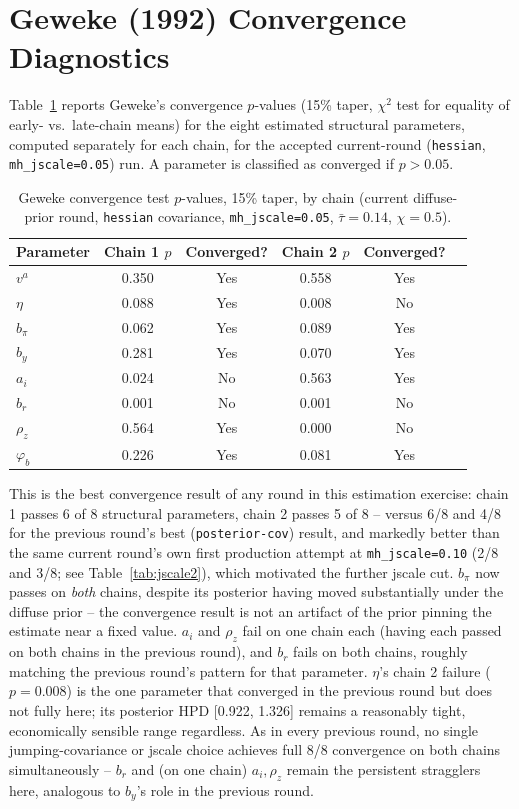 \documentclass[11pt]{article}
\begin{document}
\section{Geweke (1992) Convergence Diagnostics}
\label{sec:geweke}

Table~\ref{tab:geweke} reports Geweke's convergence $p$-values (15\%
taper, $\chi^2$ test for equality of early- vs.\ late-chain means) for
the eight estimated structural parameters, computed separately for each
chain, for the accepted current-round (\texttt{hessian},
\texttt{mh\_jscale=0.05}) run. A parameter is classified as converged if
$p>0.05$.

\begin{table}[h]
\centering
\small
\begin{tabular}{lccccc}
\toprule
Parameter & Chain 1 $p$ & Converged? & Chain 2 $p$ & Converged? \\
\midrule
$v^a$        & 0.350 & Yes & 0.558 & Yes \\
$\eta$       & 0.088 & Yes & 0.008 & No  \\
$b_\pi$      & 0.062 & Yes & 0.089 & Yes \\
$b_y$        & 0.281 & Yes & 0.070 & Yes \\
$a_i$        & 0.024 & No  & 0.563 & Yes \\
$b_r$        & 0.001 & No  & 0.001 & No  \\
$\rho_z$     & 0.564 & Yes & 0.000 & No  \\
$\varphi_b$  & 0.226 & Yes & 0.081 & Yes \\
\bottomrule
\end{tabular}
\caption{Geweke convergence test $p$-values, 15\% taper, by chain
(current diffuse-prior round, \texttt{hessian} covariance,
\texttt{mh\_jscale=0.05}, $\bar\tau=0.14$, $\chi=0.5$).}
\label{tab:geweke}
\end{table}

This is the best convergence result of any round in this estimation
exercise: chain 1 passes 6 of 8 structural parameters, chain 2 passes 5
of 8 -- versus 6/8 and 4/8 for the previous round's best
(\texttt{posterior-cov}) result, and markedly better than the same
current round's own first production attempt at \texttt{mh\_jscale=0.10}
(2/8 and 3/8; see Table~\ref{tab:jscale2}), which motivated the further
jscale cut. $b_\pi$ now passes on \emph{both} chains, despite its
posterior having moved substantially under the diffuse prior -- the
convergence result is not an artifact of the prior pinning the estimate
near a fixed value. $a_i$ and $\rho_z$ fail on one chain each (having
each passed on both chains in the previous round), and $b_r$ fails on
both chains, roughly matching the previous round's pattern for that
parameter. $\eta$'s chain 2 failure ($p=0.008$) is the one parameter
that converged in the previous round but does not fully here; its
posterior HPD [0.922, 1.326] remains a reasonably tight, economically
sensible range regardless. As in every previous round, no single
jumping-covariance or jscale choice achieves full 8/8 convergence on
both chains simultaneously -- $b_r$ and (on one chain) $a_i,\rho_z$
remain the persistent stragglers here, analogous to $b_y$'s role in the
previous round.
\end{document}
